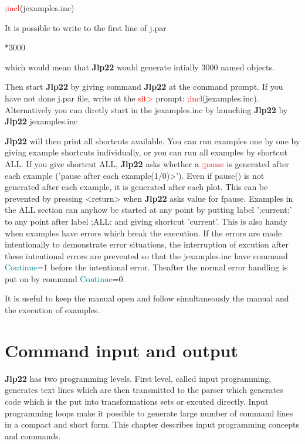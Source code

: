 \textcolor{Red}{;incl}(jexamples.inc) 
 
It is possible to write to the first line of j.par 
 
*3000 
 
which would mean that \textbf{Jlp22} would generate intially 3000 named objects. 
 
 
Then start \textbf{Jlp22} by giving command \textbf{Jlp22} at the command prompt. 
If you have not done j.par file, write at the \textcolor{Red}{sit>} prompt:  \textcolor{Red}{;incl}(jexamples.inc). 
Alternatively you can diretly start in the jexamples.inc by launching \textbf{Jlp22} by\\ 
\textbf{Jlp22} jexamples.inc 
 
\textbf{Jlp22} will then print all shortcuts available. You can run examples one by one by giving example shortcuts 
individually, or you can run all examples by shortcut ALL. If you give shortcut ALL, \textbf{Jlp22} asks whether 
a \textcolor{Red}{;pause} is generated after each example ('pause after each example(1/0)>'). 
Even if \textcolor{VioletRed}{pause}() is not generated after each example, it is generated after each plot. 
This can be prevented by pressing <return> when \textbf{Jlp22} asks value for fpause. Examples in the ALL section can anyhow be started 
at any point by putting label ';current:' to any point after label ;ALL: and giving shortcut 
'current'. This is also handy when examples have errors which break the execution. If the errors are made 
intentionally to demonstrate error situations, the interruption of excution after these intentional errors are 
prevented so that the jexamples.inc have command \textcolor{teal}{Continue}=1 before the intentional error. Theafter the normal 
error handling is put on by command \textcolor{teal}{Continue}=0. 
 
It is useful to keep the manual open and follow simultaneously the manual and the execution of examples. 
 
 
 
\section{Command input and output} 
\label{cominout} 
\textbf{Jlp22} has two programming levels. First level, called input programming, generates text lines which are then 
transmitted to the parser which generates code which is the put into transformations sets or 
excuted directly. Input programming loops make it possible to generate large number of command lines 
in a compact and short form. This chapter describes input programming concepts and commands. 
